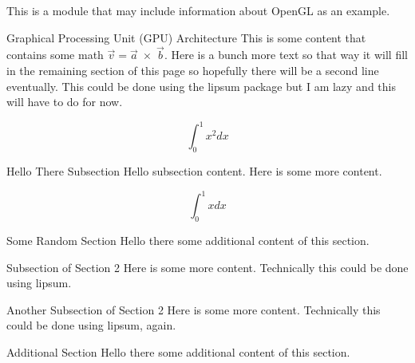\documentclass[10pt]{article}
\begin{document}


This is a module that may include information about OpenGL as an example.

\begin{section}{Graphical Processing Unit (GPU) Architecture}
This is some content that contains some math $\textstyle \vec{v} = \vec{a}\;\times\;\vec{b}$. Here is a bunch more text so that way it will fill in the remaining section of this page so hopefully there will be a second line eventually. This could be done using the lipsum package but I am lazy and this will have to do for now.

\begin{equation}
	\int_0^1 x^2 dx
\end{equation}



\begin{subsection}{Hello There Subsection}
	Hello subsection content. Here is some more content.
	
	\begin{equation}
		\int_0^1 x dx
	\end{equation}
\end{subsection}

\end{section}

\begin{section}{Some Random Section}
	Hello there some additional content of this section.
	
	\begin{subsection}{Subsection of Section 2}
		Here is some more content. Technically this could be done using lipsum.
	\end{subsection}
	
	\begin{subsection}{Another Subsection of Section 2}
		Here is some more content. Technically this could be done using lipsum, again.
	\end{subsection}
\end{section}

\begin{section}{Additional Section}
	Hello there some additional content of this section.
\end{section}
	
\end{document}
